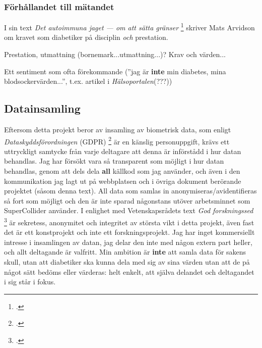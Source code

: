 \documentclass[11pt, a4paper]{article} %
\begin{document}

\subsubsection*{Förhållandet till mätandet}
I sin text \emph{Det autoimmuna jaget --- om att sätta gränser} \footcite[286]{arvidson_det_2016} skriver Mats Arvidson om kravet som diabetiker på disciplin \emph{och} prestation.

Prestation, utmattning (bornemark...utmattning...)? Krav och värden... 

Ett sentiment som ofta förekommande (''jag är \textbf{inte} min diabetes, mina blodsockervärden...'', t.ex. artikel i \emph{Hälsoportalen}(???))

\subsection*{Datainsamling}
Eftersom detta projekt beror av insamling av biometrisk data, som enligt \emph{Dataskyddsförordningen} (GDPR) \footcite{integritetsskyddsmyndigheten_kansliga_nodate} är en känslig personuppgift, krävs ett uttryckligt samtycke från varje deltagare att denna är införstådd i hur datan behandlas. Jag har försökt vara så transparent som möjligt i hur datan behandlas, genom att dels dela \textbf{all} källkod som jag använder, och även i den kommunikation jag lagt ut på webbplatsen och i övriga dokument berörande projektet (såsom denna text). All data som samlas in anonymiseras/avidentifieras så fort som möjligt och den är inte sparad någonstans utöver arbetsminnet som SuperCollider använder. I enlighet med Vetenskapsrådets text \emph{God forskningssed} \footcite[s. 40-41]{vetenskapsradet_god_2017} är sekretess, anonymitet och integritet av största vikt i detta projekt, även fast det är ett konstprojekt och inte ett forskningsprojekt. Jag har inget kommersiellt intresse i insamlingen av datan, jag delar den inte med någon extern part heller, och allt deltagande är valfritt. Min ambition är \textbf{inte} att samla data för sakens skull, utan att diabetiker ska kunna dela med sig av sina värden utan att de på något sätt bedöms eller värderas: helt enkelt, att själva delandet och deltagandet i sig står i fokus. 
\end{document}
